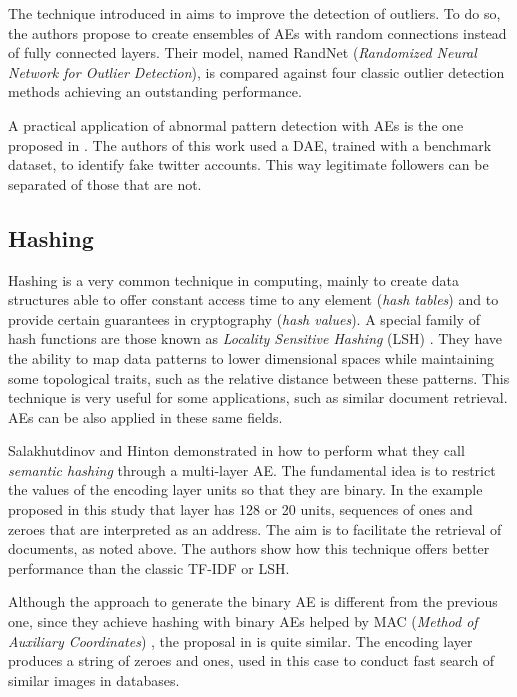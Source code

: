 \documentclass[preprint,5p,compress]{elsarticle}
\begin{document}
The technique introduced in \cite{Chen2017OutlierDW} aims to improve the detection of outliers. To do so, the authors propose to create ensembles of AEs with random connections instead of fully connected layers. Their model, named RandNet (\textit{Randomized Neural Network for Outlier Detection}), is compared against four classic outlier detection methods achieving an outstanding performance.

A practical application of abnormal pattern detection with AEs is the one proposed in \cite{Castellini2017}. The authors of this work used a DAE, trained with a benchmark dataset, to identify fake twitter accounts. This way legitimate followers can be separated of those that are not.

\subsection{Hashing}\label{Sect.Hashing}
Hashing \cite{HashingReview2017} is a very common technique in computing, mainly to create data structures able to offer constant access time to any element (\textit{hash tables}) and to provide certain guarantees in cryptography (\textit{hash values}). A special family of hash functions are those known as \textit{Locality Sensitive Hashing} (LSH) \cite{LSH}. They have the ability to map data patterns to lower dimensional spaces while maintaining some topological traits, such as the relative distance between these patterns. This technique is very useful for some applications, such as similar document retrieval. AEs can be also applied in these same fields.

Salakhutdinov and Hinton demonstrated in \cite{SemanticHashing} how to perform what they call \textit{semantic hashing} through a multi-layer AE. The fundamental idea is to restrict the values of the encoding layer units so that they are binary. In the example proposed in this study that layer has 128 or 20 units, sequences of ones and zeroes that are interpreted as an address. The aim is to facilitate the retrieval of documents, as noted above. The authors show how this technique offers better performance than the classic TF-IDF \cite{TFIDF} or LSH.

Although the approach to generate the binary AE is different from the previous one, since they achieve hashing with binary AEs helped by MAC (\textit{Method of Auxiliary Coordinates}) \cite{MethodAuxiliaryCoordinates}, the proposal in \cite{carreira-perpinan_hashing_2015} is quite similar. The encoding layer produces a string of zeroes and ones, used in this case to conduct fast search of similar images in databases.
\end{document}
